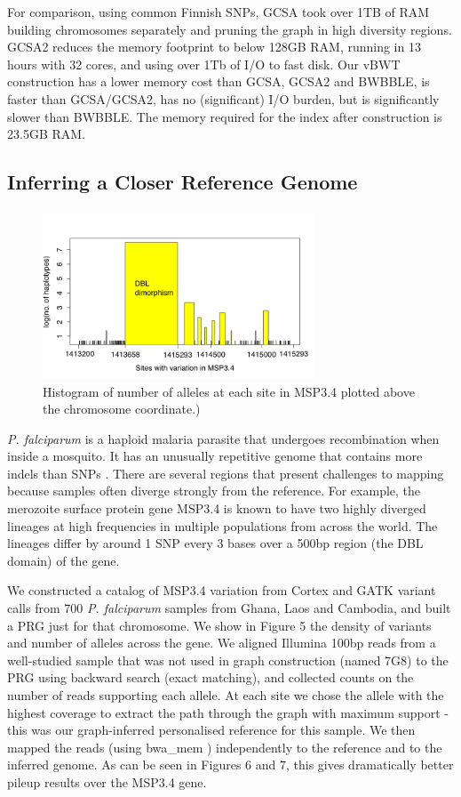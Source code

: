 \documentclass[runningheads,a4paper]{llncs}
\begin{document}
For comparison, using common Finnish SNPs, GCSA took over 1TB of RAM building chromosomes separately and pruning the graph in high diversity regions. GCSA2 reduces the memory footprint to below 128GB RAM, running in 13 hours with 32 cores, and using  over 1Tb of I/O to fast disk. Our vBWT construction has a lower memory cost than GCSA, GCSA2 and BWBBLE, is faster than GCSA/GCSA2, has no (significant) I/O burden, but is significantly slower than BWBBLE. The memory required for the index after construction is 23.5GB RAM.



\subsection{Inferring a Closer Reference Genome}

\begin{figure}
\centering
\includegraphics[height=5cm]{PRG.png}
\caption{Histogram of number of alleles at each site in MSP3.4 plotted above the chromosome coordinate.)}
\label{fig:example}
\end{figure}

\textit{P. falciparum} is a haploid malaria parasite that undergoes recombination when inside a mosquito. It has an unusually repetitive genome that contains more indels than SNPs \cite{miles}. There are several regions that present challenges to mapping because samples often diverge strongly from the reference. For example, the merozoite surface protein gene MSP3.4 is known to have two highly diverged lineages at high frequencies in multiple populations from across the world.  The lineages differ by around 1 SNP every 3 bases over a 500bp region (the DBL domain) of the gene.




We constructed a catalog of MSP3.4 variation from Cortex \cite{iqbal} and GATK \cite{depristo} variant calls from 700 \textit{P. falciparum} samples from Ghana, Laos and Cambodia, and built a PRG just for that chromosome. We show in Figure 5 the density of variants and number of alleles across the gene. We aligned Illumina 100bp reads from a well-studied sample that was not used in graph construction (named 7G8) to the PRG using backward search (exact matching), and collected counts on the number of reads supporting each allele. At each site we chose the allele with the highest coverage to extract the path through the graph with maximum support - this was our graph-inferred personalised reference for this sample. We then mapped the reads (using bwa\_mem \cite{hengli}) independently to the reference and to the inferred genome. As can be seen in Figures 6 and 7, this gives dramatically better pileup results over the MSP3.4 gene.
\end{document}
